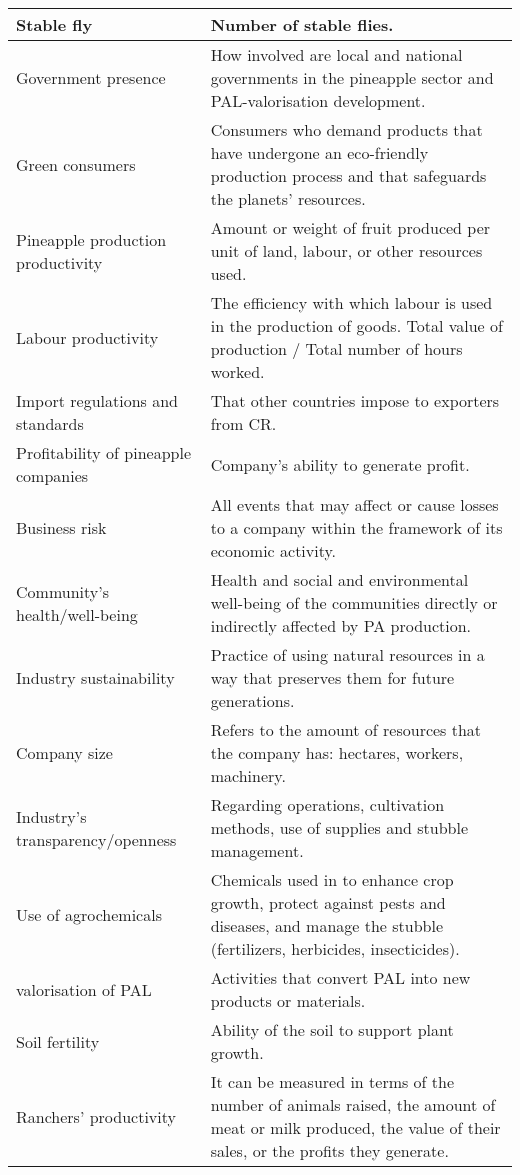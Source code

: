 \begin{appendices}
\begin{xltabular}{\textwidth}{XX}
Stable fly &
  Number of stable flies. \\ \hline
Government presence &
  How involved are local and national governments in the pineapple sector and PAL-valorisation development. \\ \hline
Green consumers &
  Consumers who demand products that have undergone an eco-friendly production process and that safeguards the planets' resources. \\ \hline
Pineapple production productivity &
  Amount or weight of fruit produced per unit of land, labour, or other resources used. \\ \hline
Labour productivity &
  The efficiency with which labour is used in the production of goods. Total value of production / Total number of hours worked. \\ \hline
Import regulations and standards &
  That other countries impose to exporters from CR. \\ \hline
Profitability of pineapple companies &
  Company's ability to generate profit. \\ \hline
Business risk &
  All events that may affect or cause losses to a company within the framework of its economic activity. \\ \hline
Community's health/well-being &
  Health and social and environmental well-being of the communities directly or indirectly affected by PA production. \\ \hline
Industry sustainability &
  Practice of using natural resources in a way that preserves them for future generations. \\ \hline
Company  size &
  Refers to the amount of resources that the company has: hectares, workers, machinery. \\ \hline
Industry's transparency/openness &
  Regarding operations, cultivation methods, use of supplies and stubble management. \\ \hline
Use of agrochemicals &
  Chemicals used in to enhance crop growth, protect against pests and diseases, and manage the stubble (fertilizers, herbicides, insecticides). \\ \hline
valorisation of PAL &
  Activities that convert PAL into new products or materials. \\ \hline
Soil fertility &
  Ability of the soil to support plant growth. \\ \hline
Ranchers' productivity &
  It can be measured in terms of the number of animals raised, the amount of meat or milk produced, the value of their sales, or the profits they generate.


\end{xltabular}
\end{appendices}
